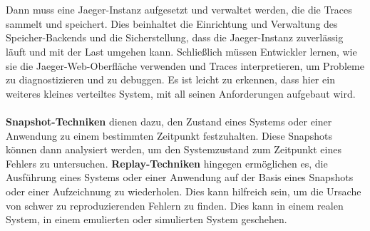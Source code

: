 \documentclass[../vs-script-first-v01.tex]{subfiles}
\begin{document}
\\\\
Dann muss eine Jaeger-Instanz aufgesetzt und verwaltet werden, die die Traces sammelt und speichert. Dies beinhaltet die Einrichtung und Verwaltung des Speicher-Backends und die Sicherstellung, dass die Jaeger-Instanz zuverlässig läuft und mit der Last umgehen kann. Schließlich müssen Entwickler lernen, wie sie die Jaeger-Web-Oberfläche verwenden und Traces interpretieren, um Probleme zu diagnostizieren und zu debuggen.
Es ist leicht zu erkennen, dass hier ein weiteres kleines verteiltes System, mit all seinen Anforderungen aufgebaut wird. 
\\\\
\textbf{Snapshot-Techniken} dienen dazu, den Zustand eines Systems oder einer Anwendung zu einem bestimmten Zeitpunkt festzuhalten. Diese Snapshots können dann analysiert werden, um den Systemzustand zum Zeitpunkt eines Fehlers zu untersuchen. \textbf{Replay-Techniken} hingegen ermöglichen es, die Ausführung eines Systems oder einer Anwendung auf der Basis eines Snapshots oder einer Aufzeichnung zu wiederholen. Dies kann hilfreich sein, um die Ursache von schwer zu reproduzierenden Fehlern zu finden. Dies kann in einem realen System, in einem emulierten oder simulierten System geschehen. 
\end{document}
